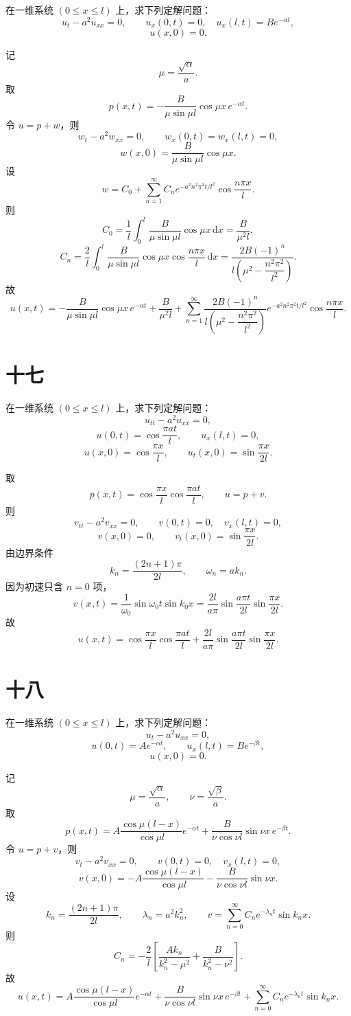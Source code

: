 \documentclass[UTF8,zihao=-4]{ctexart}
\begin{document}
在一维系统 $(0\le x\le l)$ 上，求下列定解问题：
\[
u_t-a^2u_{xx}=0,\qquad
u_x(0,t)=0,\quad u_x(l,t)=Be^{-\alpha t},
\]
\[
u(x,0)=0.
\]

记
\[
\mu=\dfrac{\sqrt{\alpha}}{a}.
\]
取
\[
p(x,t)=-\dfrac{B}{\mu\sin\mu l}\cos\mu x\,e^{-\alpha t}.
\]
令 $u=p+w$，则
\[
w_t-a^2w_{xx}=0,\qquad w_x(0,t)=w_x(l,t)=0,
\]
\[
w(x,0)=\dfrac{B}{\mu\sin\mu l}\cos\mu x.
\]
设
\[
w=C_0+\sum_{n=1}^{\infty}C_ne^{-a^2n^2\pi^2t/l^2}\cos\dfrac{n\pi x}{l}.
\]
则
\[
C_0=\dfrac{1}{l}\int_0^l\dfrac{B}{\mu\sin\mu l}\cos\mu x\,\mathrm{d}x
=\dfrac{B}{\mu^2l},
\]
\[
C_n=\dfrac{2}{l}\int_0^l\dfrac{B}{\mu\sin\mu l}
\cos\mu x\cos\dfrac{n\pi x}{l}\,\mathrm{d}x
=\dfrac{2B(-1)^n}{l\left(\mu^2-\dfrac{n^2\pi^2}{l^2}\right)}.
\]
故
\[
u(x,t)=-\dfrac{B}{\mu\sin\mu l}\cos\mu x\,e^{-\alpha t}
+\dfrac{B}{\mu^2l}
+\sum_{n=1}^{\infty}
\dfrac{2B(-1)^n}{l\left(\mu^2-\dfrac{n^2\pi^2}{l^2}\right)}
e^{-a^2n^2\pi^2t/l^2}\cos\dfrac{n\pi x}{l}.
\]

\section*{十七}

在一维系统 $(0\le x\le l)$ 上，求下列定解问题：
\[
u_{tt}-a^2u_{xx}=0,
\]
\[
u(0,t)=\cos\dfrac{\pi at}{l},\qquad u_x(l,t)=0,
\]
\[
u(x,0)=\cos\dfrac{\pi x}{l},\qquad
u_t(x,0)=\sin\dfrac{\pi x}{2l}.
\]

取
\[
p(x,t)=\cos\dfrac{\pi x}{l}\cos\dfrac{\pi at}{l},
\qquad u=p+v.
\]
则
\[
v_{tt}-a^2v_{xx}=0,\qquad v(0,t)=0,\quad v_x(l,t)=0,
\]
\[
v(x,0)=0,\qquad v_t(x,0)=\sin\dfrac{\pi x}{2l}.
\]
由边界条件
\[
k_n=\dfrac{(2n+1)\pi}{2l},\qquad \omega_n=ak_n.
\]
因为初速只含 $n=0$ 项，
\[
v(x,t)=\dfrac{1}{\omega_0}\sin\omega_0t\sin k_0x
=\dfrac{2l}{a\pi}\sin\dfrac{a\pi t}{2l}\sin\dfrac{\pi x}{2l}.
\]
故
\[
u(x,t)=\cos\dfrac{\pi x}{l}\cos\dfrac{\pi at}{l}
+\dfrac{2l}{a\pi}\sin\dfrac{a\pi t}{2l}\sin\dfrac{\pi x}{2l}.
\]

\section*{十八}

在一维系统 $(0\le x\le l)$ 上，求下列定解问题：
\[
u_t-a^2u_{xx}=0,
\]
\[
u(0,t)=Ae^{-\alpha t},\qquad u_x(l,t)=Be^{-\beta t},
\]
\[
u(x,0)=0.
\]

记
\[
\mu=\dfrac{\sqrt{\alpha}}{a},\qquad
\nu=\dfrac{\sqrt{\beta}}{a}.
\]
取
\[
p(x,t)=A\dfrac{\cos\mu(l-x)}{\cos\mu l}e^{-\alpha t}
+\dfrac{B}{\nu\cos\nu l}\sin\nu x\,e^{-\beta t}.
\]
令 $u=p+v$，则
\[
v_t-a^2v_{xx}=0,\qquad v(0,t)=0,\quad v_x(l,t)=0,
\]
\[
v(x,0)=-
A\dfrac{\cos\mu(l-x)}{\cos\mu l}
-\dfrac{B}{\nu\cos\nu l}\sin\nu x.
\]
设
\[
k_n=\dfrac{(2n+1)\pi}{2l},\qquad \lambda_n=a^2k_n^2,
\qquad
v=\sum_{n=0}^{\infty}C_ne^{-\lambda_nt}\sin k_nx.
\]
则
\[
C_n=-\dfrac{2}{l}
\left[
\dfrac{Ak_n}{k_n^2-\mu^2}
+\dfrac{B}{k_n^2-\nu^2}
\right].
\]
故
\[
u(x,t)=
A\dfrac{\cos\mu(l-x)}{\cos\mu l}e^{-\alpha t}
+\dfrac{B}{\nu\cos\nu l}\sin\nu x\,e^{-\beta t}
+\sum_{n=0}^{\infty}C_ne^{-\lambda_nt}\sin k_nx.
\]
\end{document}
